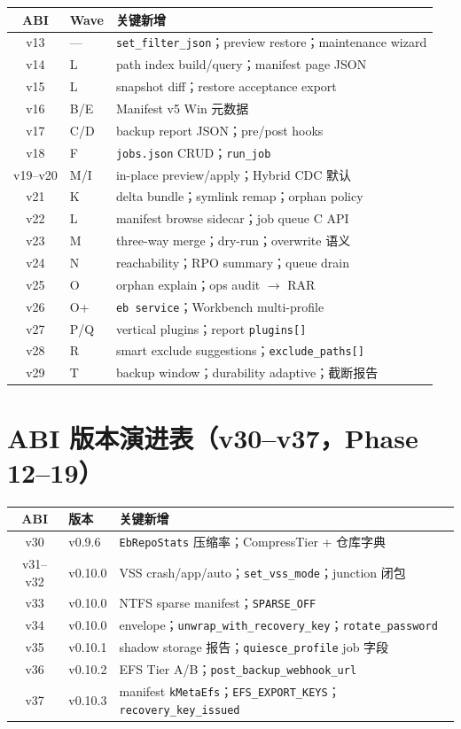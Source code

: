 \begin{longtable}{@{}clp{7.5cm}@{}}
\toprule
ABI & Wave & 关键新增 \\
\midrule
v13 & — & \texttt{set\_filter\_json}；preview restore；maintenance wizard \\
v14 & L & path index build/query；manifest page JSON \\
v15 & L & snapshot diff；restore acceptance export \\
v16 & B/E & Manifest v5 Win 元数据 \\
v17 & C/D & backup report JSON；pre/post hooks \\
v18 & F & \texttt{jobs.json} CRUD；\texttt{run\_job} \\
v19--v20 & M/I & in-place preview/apply；Hybrid CDC 默认 \\
v21 & K & delta bundle；symlink remap；orphan policy \\
v22 & L & manifest browse sidecar；job queue C API \\
v23 & M & three-way merge；dry-run；overwrite 语义 \\
v24 & N & reachability；RPO summary；queue drain \\
v25 & O & orphan explain；ops audit $\rightarrow$ RAR \\
v26 & O+ & \texttt{eb service}；Workbench multi-profile \\
v27 & P/Q & vertical plugins；report \texttt{plugins[]} \\
v28 & R & smart exclude suggestions；\texttt{exclude\_paths[]} \\
v29 & T & backup window；durability adaptive；截断报告 \\
\bottomrule
\end{longtable}

\section{ABI 版本演进表（v30--v37，Phase 12--19）}

\begin{longtable}{@{}clp{7.5cm}@{}}
\toprule
ABI & 版本 & 关键新增 \\
\midrule
v30 & v0.9.6 & \texttt{EbRepoStats} 压缩率；CompressTier + 仓库字典 \\
v31--v32 & v0.10.0 & VSS crash/app/auto；\texttt{set\_vss\_mode}；junction 闭包 \\
v33 & v0.10.0 & NTFS sparse manifest；\texttt{SPARSE\_OFF} \\
v34 & v0.10.0 & envelope；\texttt{unwrap\_with\_recovery\_key}；\texttt{rotate\_password} \\
v35 & v0.10.1 & shadow storage 报告；\texttt{quiesce\_profile} job 字段 \\
v36 & v0.10.2 & EFS Tier A/B；\texttt{post\_backup\_webhook\_url} \\
v37 & v0.10.3 & manifest \texttt{kMetaEfs}；\texttt{EFS\_EXPORT\_KEYS}；\texttt{recovery\_key\_issued} \\
\bottomrule
\end{longtable}

